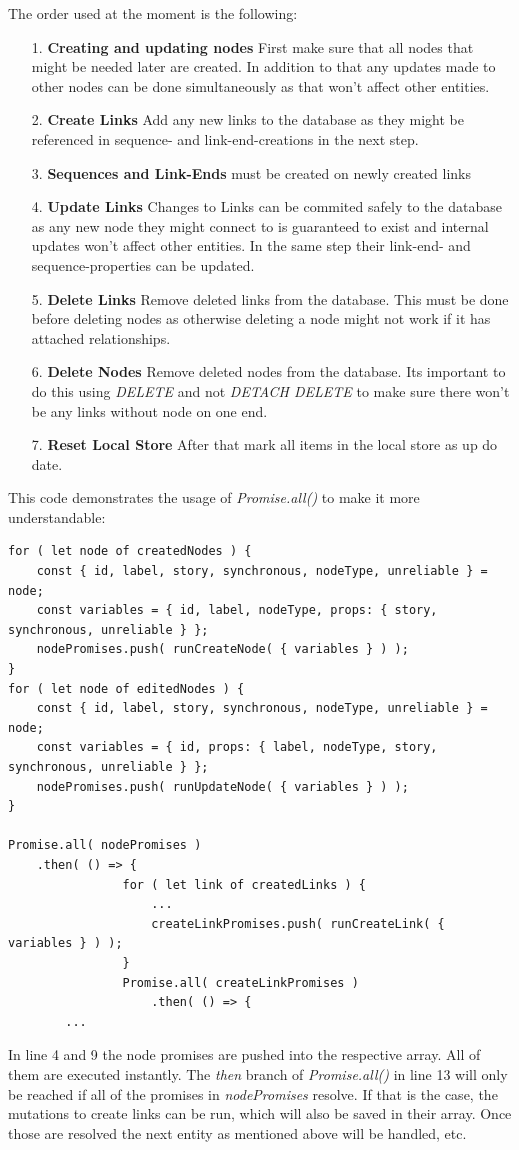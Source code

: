 The order used at the moment is the following:
\begin{itemize}
\item[1.] \textbf{Creating and updating nodes} First make sure that all nodes that might be needed later are created. In addition to that any updates made to other nodes can be done simultaneously as that won't affect other entities.
\item[2.] \textbf{Create Links} Add any new links to the database as they might be referenced in sequence- and link-end-creations in the next step.
\item[3.] \textbf{Sequences and Link-Ends} must be created on newly created links
\item[4.] \textbf{Update Links} Changes to Links can be commited safely to the database as any new node they might connect to is guaranteed to exist and internal updates won't affect other entities. In the same step their link-end- and sequence-properties can be updated.
\item[5.] \textbf{Delete Links} Remove deleted links from the database. This must be done before deleting nodes as otherwise deleting a node might not work if it has attached relationships.
\item[6.] \textbf{Delete Nodes} Remove deleted nodes from the database. Its important to do this using \emph{DELETE} and not \emph{DETACH DELETE} to make sure there won't be any links without node on one end.
\item[7.] \textbf{Reset Local Store} After that mark all items in the local store as up do date.
\end{itemize}

This code demonstrates the usage of \emph{Promise.all()} to make it more understandable:
\begin{lstlisting}[caption={Usage of Promise.all()}]
for ( let node of createdNodes ) {
	const { id, label, story, synchronous, nodeType, unreliable } = node;
	const variables = { id, label, nodeType, props: { story, synchronous, unreliable } };
	nodePromises.push( runCreateNode( { variables } ) );
}
for ( let node of editedNodes ) {
	const { id, label, story, synchronous, nodeType, unreliable } = node;
	const variables = { id, props: { label, nodeType, story, synchronous, unreliable } };
	nodePromises.push( runUpdateNode( { variables } ) );
}

Promise.all( nodePromises ) 
	.then( () => {
				for ( let link of createdLinks ) {
					...
					createLinkPromises.push( runCreateLink( { variables } ) );				
				}
				Promise.all( createLinkPromises )
					.then( () => {	
		...
\end{lstlisting}
In line 4 and 9 the node promises are pushed into the respective array. All of them are executed instantly. The \emph{then} branch of \emph{Promise.all()} in line 13 will only be reached if all of the promises in \emph{nodePromises} resolve. If that is the case, the mutations to create links can be run, which will also be saved in their array. Once those are resolved the next entity as mentioned above will be handled, etc.

